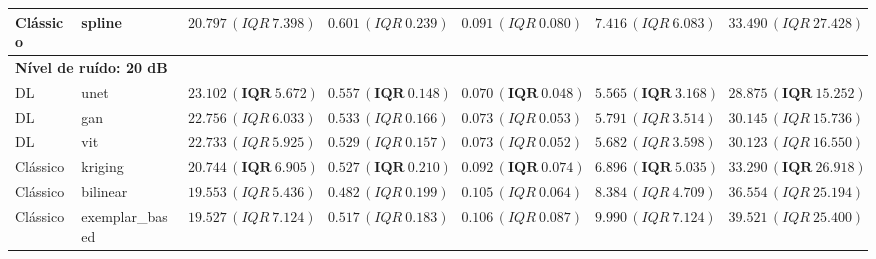 \begin{table}[htbp]
{\begin{tabular}{llccccc}
Clássico & spline & $20.797\,(IQR\ 7.398)$ & $0.601\,(IQR\ 0.239)$ & $0.091\,(IQR\ 0.080)$ & $7.416\,(IQR\ 6.083)$ & $33.490\,(IQR\ 27.428)$ \\
\midrule
\multicolumn{7}{l}{\textbf{Nível de ruído: 20 dB}} \\
DL & unet & $\mathbf{23.102\,(IQR\ 5.672)}$ & $\mathbf{0.557\,(IQR\ 0.148)}$ & $\mathbf{0.070\,(IQR\ 0.048)}$ & $\mathbf{5.565\,(IQR\ 3.168)}$ & $\mathbf{28.875\,(IQR\ 15.252)}$ \\
DL & gan & $22.756\,(IQR\ 6.033)$ & $0.533\,(IQR\ 0.166)$ & $0.073\,(IQR\ 0.053)$ & $5.791\,(IQR\ 3.514)$ & $30.145\,(IQR\ 15.736)$ \\
DL & vit & $22.733\,(IQR\ 5.925)$ & $0.529\,(IQR\ 0.157)$ & $0.073\,(IQR\ 0.052)$ & $5.682\,(IQR\ 3.598)$ & $30.123\,(IQR\ 16.550)$ \\
Clássico & kriging & $\mathbf{20.744\,(IQR\ 6.905)}$ & $\mathbf{0.527\,(IQR\ 0.210)}$ & $\mathbf{0.092\,(IQR\ 0.074)}$ & $\mathbf{6.896\,(IQR\ 5.035)}$ & $\mathbf{33.290\,(IQR\ 26.918)}$ \\
Clássico & bilinear & $19.553\,(IQR\ 5.436)$ & $0.482\,(IQR\ 0.199)$ & $0.105\,(IQR\ 0.064)$ & $8.384\,(IQR\ 4.709)$ & $36.554\,(IQR\ 25.194)$ \\
Clássico & exemplar\_based & $19.527\,(IQR\ 7.124)$ & $0.517\,(IQR\ 0.183)$ & $0.106\,(IQR\ 0.087)$ & $9.990\,(IQR\ 7.124)$ & $39.521\,(IQR\ 25.400)$ \\
\bottomrule
\end{tabular}
}
\end{table}
